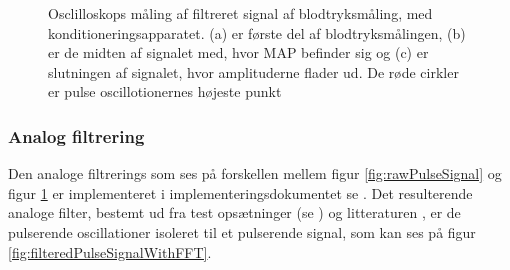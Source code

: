 \begin{figure}[H]
	\centering
	\caption{Osclilloskops måling af filtreret signal af blodtryksmåling, med konditioneringsapparatet. (a) er første del af blodtryksmålingen, (b) er de midten af signalet med, hvor MAP befinder sig og (c) er slutningen af signalet, hvor amplituderne flader ud. De røde cirkler er pulse oscillotionernes højeste punkt}\label{fig:filteredPulseSignal}
\end{figure}

\subsubsection{Analog filtrering}
Den analoge filtrerings som ses på forskellen mellem figur \ref{fig:rawPulseSignal} og figur \ref{fig:filteredPulseSignal} er implementeret i implementeringsdokumentet se . 
Det resulterende analoge filter, bestemt ud fra test opsætninger (se ) og litteraturen , er de pulserende oscillationer isoleret til et pulserende signal, som kan ses på figur \ref*{fig:filteredPulseSignalWithFFT}.

